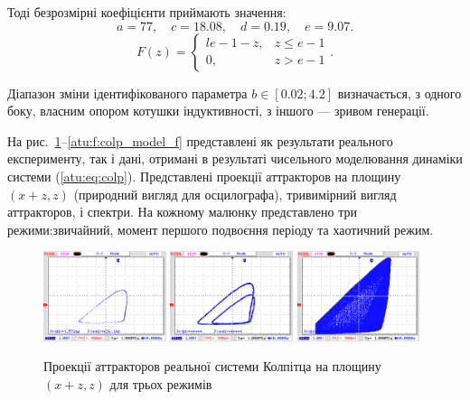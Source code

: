 Тоді безрозмірні коефіцієнти приймають значення:
\[
 a = 77,     \quad
 c = 18.08,  \quad
 d = 0.19,   \quad
 e = 9.07.
\]
%
\[
F(z) =
\begin{cases}{l}
  e-1-z, & z \le e-1  \\
  0,     & z  >  e-1
\end{cases}.
\]

Діапазон зміни ідентифікованого параметра
$ b \in [0.02; 4.2] $ визначається, з одного боку, власним опором котушки
індуктивності, з іншого --- зривом генерації.

На рис.~\ref{atu:f:colp_real_xzz}--\ref{atu:f:colp_model_f} представлені як
результати реального експерименту, так і дані, отримані в
результаті чисельного моделювання динаміки системи (\ref{atu:eq:colp}).
Представлені проекції аттракторов на площину
$ (x + z, z) $ (природний вигляд для осцилографа), тривимірний вигляд
аттракторов, і спектри. На кожному малюнку представлено три
режими:звичайний, момент першого подвоєння періоду та хаотичний
режим.


\begin{figure}[htb!]
 \centerline{
   \includegraphics[width=0.32\textwidth]{p/mod/colp_m1_vv.png}
   \includegraphics[width=0.32\textwidth]{p/mod/colp_m2_vv.png}
   \includegraphics[width=0.32\textwidth]{p/mod/colp_m3_vv_ac.png}
 }
\caption{Проекції аттракторов реальної системи Колпітца на площину $ (x + z, z) $ для трьох режимів}
\label{atu:f:colp_real_xzz}
\end{figure}

